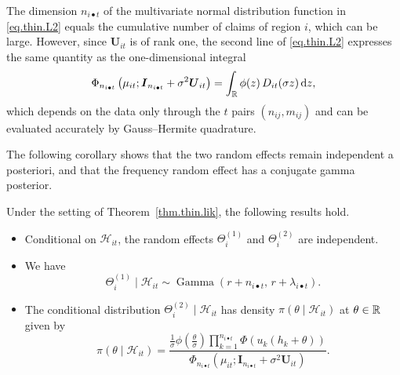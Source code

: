 \begin{remark}[Computation]
\label{rem.thin.computation}
The dimension \(n_{i\bullet t}\) of the multivariate normal
distribution function in \eqref{eq.thin.L2} equals the cumulative
number of claims of region \(i\), which can be large. However, since
\(\boldsymbol U_{it}\) is of rank one, the second line of
\eqref{eq.thin.L2} expresses the same quantity as the one-dimensional
integral
\[
\Phi_{n_{i\bullet t}}
\left(
\mu_{it};
\boldsymbol I_{n_{i\bullet t}}+\sigma^2\boldsymbol U_{it}
\right)
=
\int_{\mathbb{R}}\phi(z)\,D_{it}(\sigma z)\,{\rm d}z,
\]
which depends on the data only through the \(t\) pairs
\((n_{ij},m_{ij})\) and can be evaluated accurately by Gauss--Hermite
quadrature.
\end{remark}

The following corollary shows that the two random effects remain
independent a posteriori, and that the frequency random effect has a
conjugate gamma posterior.

\begin{corollary}
\label{cor.thin.posterior}
Under the setting of Theorem~\ref{thm.thin.lik}, the following
results hold.
\begin{itemize}
  \item[i.] Conditional on \(\mathcal H_{it}\), the random effects
  \(\Theta_i^{(1)}\) and \(\Theta_i^{(2)}\) are independent.

  \item[ii.] We have
  \[
  \Theta_i^{(1)}\mid\mathcal H_{it}
  \sim
  \operatorname{Gamma}\left(r+n_{i\bullet t},\,r+\lambda_{i\bullet t}\right).
  \]

  \item[iii.] The conditional distribution
  \(\Theta_i^{(2)}\mid\mathcal H_{it}\) has density
  \(\pi(\theta\mid\mathcal H_{it})\) at \(\theta\in\mathbb{R}\) given by
  \begin{equation}\label{eq.thin.posterior2}
  \pi(\theta\mid\mathcal H_{it})
  =
  \frac{
  \displaystyle
  \frac{1}{\sigma}\phi\left(\frac{\theta}{\sigma}\right)
  \prod_{k=1}^{n_{i\bullet t}}
  \Phi\left(u_k(h_k+\theta)\right)
  }{
  \Phi_{n_{i\bullet t}}
  \left(
  \mu_{it};
  \boldsymbol I_{n_{i\bullet t}}+\sigma^2\boldsymbol U_{it}
  \right)
  }.
  \end{equation}
\end{itemize}
\end{corollary}

